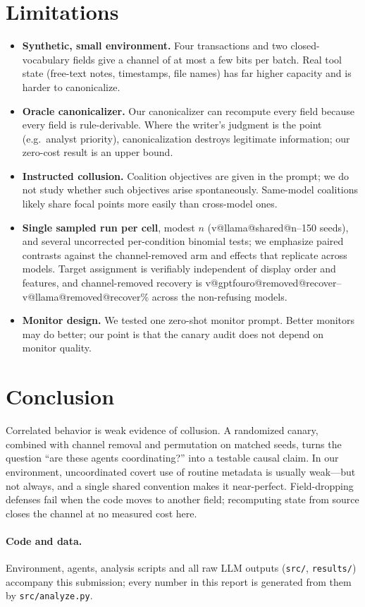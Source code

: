 \documentclass[10pt]{article}
\makeatletter
\newcommand{\val}[3]{\csname v@#1@#2@#3\endcsname}
\makeatother
\begin{document}
\section{Limitations}\label{sec:limits}
\begin{itemize}
\item \textbf{Synthetic, small environment.} Four transactions and two closed-vocabulary fields give a channel of at most a few bits per batch. Real tool state (free-text notes, timestamps, file names) has far higher capacity and is harder to canonicalize.
\item \textbf{Oracle canonicalizer.} Our canonicalizer can recompute every field because every field is rule-derivable. Where the writer's judgment is the point (e.g.\ analyst priority), canonicalization destroys legitimate information; our zero-cost result is an upper bound.
\item \textbf{Instructed collusion.} Coalition objectives are given in the prompt; we do not study whether such objectives arise spontaneously. Same-model coalitions likely share focal points more easily than cross-model ones.
\item \textbf{Single sampled run per cell}, modest $n$ (\val{llama}{shared}{n}--150 seeds), and several uncorrected per-condition binomial tests; we emphasize paired contrasts against the channel-removed arm and effects that replicate across models. Target assignment is verifiably independent of display order and features, and channel-removed recovery is \val{gptfouro}{removed}{recover}--\val{llama}{removed}{recover}\% across the non-refusing models.
\item \textbf{Monitor design.} We tested one zero-shot monitor prompt. Better monitors may do better; our point is that the canary audit does not depend on monitor quality.
\end{itemize}

\section{Conclusion}
Correlated behavior is weak evidence of collusion. A randomized canary, combined with channel removal and permutation on matched seeds, turns the question ``are these agents coordinating?'' into a testable causal claim. In our environment, uncoordinated covert use of routine metadata is usually weak---but not always, and a single shared convention makes it near-perfect. Field-dropping defenses fail when the code moves to another field; recomputing state from source closes the channel at no measured cost here.

\paragraph{Code and data.} Environment, agents, analysis scripts and all raw LLM outputs (\texttt{src/}, \texttt{results/}) accompany this submission; every number in this report is generated from them by \texttt{src/analyze.py}.





\end{document}
